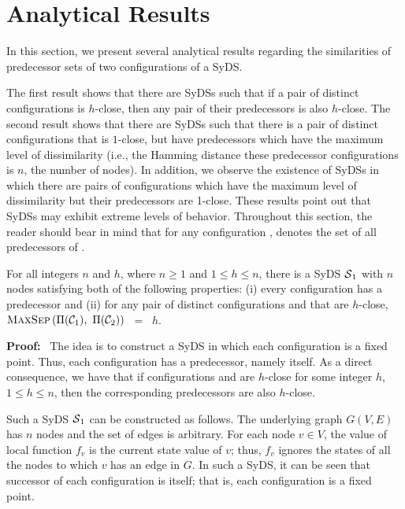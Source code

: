 \section{Analytical Results}
\label{sec:analysis}

In this section, we present several analytical results regarding the
similarities of predecessor sets of two configurations of a SyDS.

The first result shows that there are SyDSs such that 
if a pair of distinct configurations is $h$-close, then 
any pair of their predecessors is also $h$-close.
The second result shows that there are SyDSs such that 
there is a pair of distinct configurations that is $1$-close, but 
have predecessors which have the maximum level of dissimilarity
(i.e., the Hamming distance these predecessor configurations
is $n$, the number of nodes).
In addition, we observe the existence of SyDSs in which there 
are pairs of configurations which have the maximum level 
of dissimilarity but their predecessors are 1-close. 
These results point out that SyDSs may exhibit 
extreme levels of behavior.
Throughout this section, the reader should bear in mind that
for any configuration \calc, \predset{\calc}{}
denotes the set of all predecessors of \calc.

\begin{proposition}\label{pro:close-close}
For all integers $n$ and $h$, where $n \geq 1$ and $1 \leq h \leq n$,
there is a SyDS $\mbox{$\mathcal{S}$}_1${} with $n$
nodes satisfying both of the following properties: 
(i) every configuration has a predecessor and (ii) 
for any pair of distinct configurations
\calcone{} and \calctwo{} that are $h$-close, 
$\mbox{\textsc{MaxSep}}\left( \mbox{$\Pi(\mbox{$\mathcal{C}_{1}$})$},~ \mbox{$\Pi(\mbox{$\mathcal{C}_{2}$})$} \right)$ ~=~ $h$.
\end{proposition}

\noindent
\textbf{Proof:}~ The idea is to construct a SyDS in which each configuration
is a fixed point.
Thus, each configuration \calc{} has a predecessor, namely \calc{} itself.
As a direct consequence, we have that if configurations \calcone{} and
\calctwo{} are $h$-close for some integer $h$, $1 \leq h \leq n$,
then the corresponding predecessors are also $h$-close.

Such a SyDS $\mbox{$\mathcal{S}$}_1${} can be constructed as follows.
The underlying graph $G(V,E)$ has $n$ nodes and the set of edges is arbitrary.
For each node $v \in V$, the value of local function $f_v$ is the 
current state value of $v$; thus, $f_v$ ignores the states of all the nodes
to which $v$ has an edge in $G$.
In such a SyDS, it can be seen that successor of each configuration \calc{}
is \calc{} itself; that is, each configuration is a fixed point. \QED

